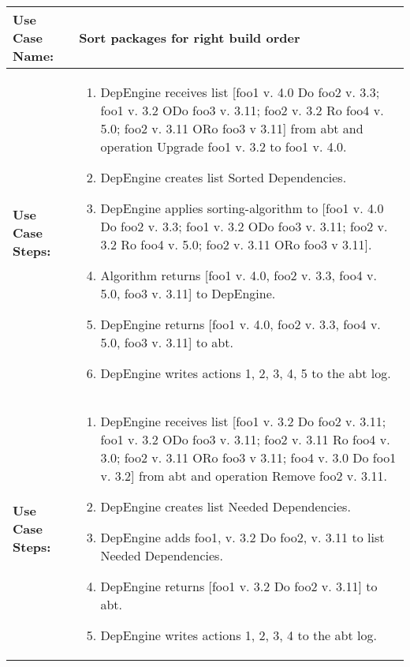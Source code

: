 \begin{tabularx}{\linewidth}{|l|X|}
\hline
\textbf{Use Case Name:} & \textbf{Sort packages for right build order} \\
\hline
\textbf{Use Case Steps:} & 
\begin{minipage}{\linewidth} 
  \vspace{0.05em}
  \begin{enumerate}
  \item DepEngine receives list [foo1 v. 4.0 Do foo2 v. 3.3; foo1 v. 3.2 ODo foo3 v. 3.11; foo2 v. 3.2 Ro foo4 v. 5.0; foo2 v. 3.11 ORo foo3 v 3.11] from abt and operation Upgrade foo1 v. 3.2 to foo1 v. 4.0.
  \item DepEngine creates list Sorted Dependencies.
  \item DepEngine applies sorting-algorithm to [foo1 v. 4.0 Do foo2 v. 3.3; foo1 v. 3.2 ODo foo3 v. 3.11; foo2 v. 3.2 Ro foo4 v. 5.0; foo2 v. 3.11 ORo foo3 v 3.11].
  \item Algorithm returns [foo1 v. 4.0, foo2 v. 3.3, foo4 v. 5.0, foo3 v. 3.11] to DepEngine.
  \item DepEngine returns [foo1 v. 4.0, foo2 v. 3.3, foo4 v. 5.0, foo3 v. 3.11] to abt.
  \item DepEngine writes actions 1, 2, 3, 4, 5 to the abt log.
    \end{enumerate}
  \vspace{0.05em}
\end{minipage}
\\
\hline 
\textbf{Use Case Steps:} & 
\begin{minipage}{\linewidth} 
  \vspace{0.05em}
  \begin{enumerate}
  \item DepEngine receives list [foo1 v. 3.2 Do foo2 v. 3.11; foo1 v. 3.2 ODo foo3 v. 3.11; foo2 v. 3.11 Ro foo4 v. 3.0; foo2 v. 3.11 ORo foo3 v 3.11; foo4 v. 3.0 Do foo1 v. 3.2] from abt and operation Remove foo2 v. 3.11.
  \item DepEngine creates list Needed Dependencies.
  \item DepEngine adds foo1, v. 3.2 Do foo2, v. 3.11 to list Needed Dependencies.
  \item DepEngine returns [foo1 v. 3.2 Do foo2 v. 3.11] to abt.
  \item DepEngine writes actions 1, 2, 3, 4 to the abt log.
    \end{enumerate}
  \vspace{0.05em}
\end{minipage}

\end{tabularx}
